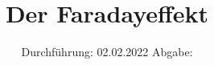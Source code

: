 

\subject{V46}
\title{Der Faradayeffekt}
\date{%
  Durchführung: 02.02.2022
  \hspace{3em}
  Abgabe: 
}



\maketitle
\thispagestyle{empty}
\tableofcontents
\newpage







\printbibliography{}


